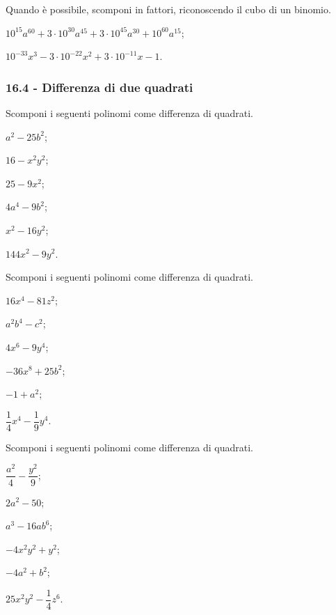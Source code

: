 \begin{esercizio}
\label{ese:16.28}
Quando è possibile, scomponi in fattori, riconoscendo il cubo di un binomio.
\begin{enumeratea}
 \item $10^{15}a^{60}+3\cdot 10^{30}a^{45}+3\cdot 10^{45}a^{30}+10^{60}a^{15}$;
 \item $10^{-33}x^{3}-3\cdot 10^{-22}x^{2}+3\cdot 10^{-11}x-1$.
\end{enumeratea}
\end{esercizio}

\subsubsection*{16.4 - Differenza di due quadrati}
\begin{multicols}{2}
\begin{esercizio}
\label{ese:16.29}
Scomponi i seguenti polinomi come differenza di quadrati.
\begin{enumeratea}
 \item $a^{2}-25b^{2}$;
 \item $16-x^{2}y^{2}$;
 \item $25-9x^{2}$;
 \item $4a^{4}-9b^{2}$;
 \item $x^{2}-16y^{2}$;
 \item $144x^{2}-9y^{2}$.
\end{enumeratea}
\end{esercizio}

\begin{esercizio}
\label{ese:16.30}
Scomponi i seguenti polinomi come differenza di quadrati.
\begin{enumeratea}
 \item $16x^{4}-81z^{2}$;
 \item $a^{2}b^{4}-c^{2}$;
 \item $4x^{6}-9y^{4}$;
 \item $-36x^{8}+25b^{2}$;
 \item $-1+a^{2}$;
 \item $\dfrac{1}{4}x^{4}-\dfrac{1}{9}y^{4}$.
\end{enumeratea}
\end{esercizio}

\begin{esercizio}
\label{ese:16.31}
Scomponi i seguenti polinomi come differenza di quadrati.
\begin{enumeratea}
 \item $\dfrac{a^{2}}{4}-\dfrac{y^{2}}{9}$;
 \item $2a^{2}-50$;
 \item $a^{3}-16{ab}^{6}$;
 \item $-4x^{2}y^{2}+y^{2}$;
 \item $-4a^{2}+b^{2}$;
 \item $25x^{2}y^{2}-\dfrac{1}{4}z^{6}$.
\end{enumeratea}
\end{esercizio}


\end{multicols}
